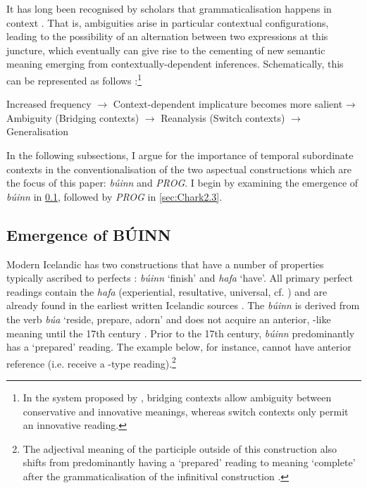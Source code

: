 \documentclass[output=paper,colorlinks,citecolor=brown]{langscibook}
\begin{document}
It has long been recognised by scholars that grammaticalisation happens in context \citep{diewald2002model, heine2002role}. That is, ambiguities arise in particular contextual configurations, leading to the possibility of an alternation between two expressions at this juncture, which eventually can give rise to the cementing of new semantic meaning emerging from contextually-dependent inferences. Schematically, this can be represented as follows \citep{heine1991grammaticalization}:\footnote{In the system proposed by \citet{heine1991grammaticalization}, bridging contexts allow ambiguity between conservative and innovative meanings, whereas switch contexts only permit an innovative reading.}

\ea
Increased frequency $\rightarrow$ Context-dependent implicature becomes more salient → Ambiguity (Bridging contexts) $\rightarrow$ Reanalysis (Switch contexts) $\rightarrow$ Generalisation
\z

In the following subsections, I argue for the importance of temporal subordinate contexts in the conventionalisation of the two aspectual constructions which are the focus of this paper: \textit{búinn} and \textit{PROG}. I begin by examining the emergence of \textit{búinn} in \ref{sec:Chark2.2}, followed by \textit{PROG} in \ref{sec:Chark2.3}.

\subsection{Emergence of BÚINN}\label{sec:Chark2.2}

Modern Icelandic has two constructions that have a number of properties typically ascribed to perfects \citep{jonsson1992, thrainsson2017developing}: \textit{búinn} `finish' and \textit{hafa} `have'. All primary perfect readings contain the \textit{hafa}   (experiential, resultative, universal, cf. \cite{mccawley1971tense, comrie1976aspect})  and are already found in the earliest written Icelandic sources \citep{nygaard1905norron, pollak1930}. The   \textit{búinn} is derived from the verb \textit{búa} `reside, prepare, adorn' and does not acquire an anterior, -like meaning until the 17th century \citep{thrainsson2017developing}. Prior to the 17th century, \textit{búinn} predominantly has a `prepared' reading. The example below, for instance, cannot have anterior reference (i.e. receive a -type reading).\footnote{The adjectival meaning of the participle outside of this construction also shifts from predominantly having a `prepared' reading to meaning `complete' after the grammaticalisation of the infinitival construction \citep{arnason1977buinn}.} 
\end{document}
